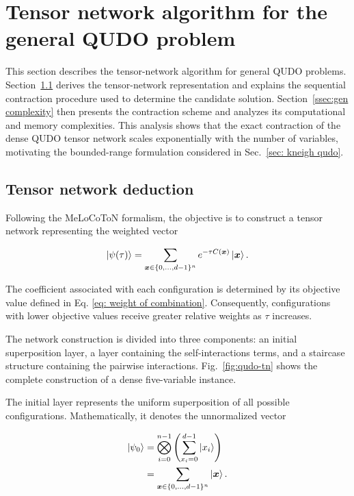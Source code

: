 \documentclass[%
 reprint,
 amsmath,amssymb,
 aps,
 pra,showkeys,
]{revtex4-2}
\begin{document}
\section{Tensor network algorithm for the general QUDO problem}\label{sec:tn_general_qudo}
This section describes the tensor-network algorithm for general QUDO
problems. Section~\ref{ssec:gen deduction} derives the tensor-network
representation and explains the
sequential contraction procedure used to determine the candidate solution. Section~\ref{ssec:gen complexity} then presents the
contraction scheme and analyzes its computational and memory
complexities. This analysis shows that the exact contraction of the
dense QUDO tensor network scales exponentially with the number of variables,
motivating the bounded-range formulation considered in
Sec.~\ref{sec: kneigh qudo}.

\subsection{Tensor network deduction}\label{ssec:gen deduction}
Following the MeLoCoToN formalism, the objective is to construct a
tensor network representing the weighted vector

\begin{equation}
\label{eq:general-qudo-weighted-vector}
\ket{\psi(\tau)}
=
\sum_{\boldsymbol{x}\in\{0,\ldots,d-1\}^{n}}
e^{-\tau C(\boldsymbol{x})}
\ket{\boldsymbol{x}}.
\end{equation}

The coefficient associated with each configuration is determined by its
objective value defined in Eq. \ref{eq: weight of combination}. Consequently, configurations with lower objective values receive greater relative weights as $\tau$ increases.

The network construction is divided into three components: an initial
superposition layer, a layer containing the self-interactions terms, and a
staircase structure containing the pairwise interactions.
Fig.~\ref{fig:qudo-tn} shows the complete construction of a dense
five-variable instance.

The initial layer represents the uniform superposition of all possible configurations. Mathematically, it denotes the
unnormalized vector

\begin{equation}
\label{eq:qudo-initial-vector}
\begin{aligned}
\ket{\psi_0}
&=
\bigotimes_{i=0}^{n-1}
\left(
    \sum_{x_i=0}^{d-1}\ket{x_i}
\right) \\
&=
\sum_{\boldsymbol{x}\in\{0,\ldots,d-1\}^{n}}
\ket{\boldsymbol{x}}.
\end{aligned}
\end{equation}
\end{document}
